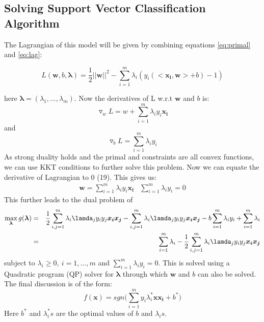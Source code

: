 \documentclass{article}
\begin{document}
\subsection{Solving Support Vector Classification Algorithm}
The Lagrangian of this model will be given by combining equations \ref{eq:primal} and \ref{eq:lag}:
\begin{center}
\begin{equation*}
    L(\bm{w},b,\bm{\lambda}) = \frac{1}{2} ||\bm{w}||^2 - \sum_{i=1}^{m}{\lambda_i(y_i(<\bm{x_i},\bm{w}> +b) -1)}
\end{equation*}
\end{center}
here $\bm{\lambda} = (\lambda_1,...,\lambda_m)$. Now the derivatives of L w.r.t $\bm{w}$ and $b$ is:
\begin{equation*}
    \triangledown_w L = w + \sum_{i=1}^{m}{\lambda_iy_i\bm{x_i}}
\end{equation*} and 
\begin{equation*}
    \triangledown_b L = \sum_{i=1}^{m}{\lambda_iy_i}
\end{equation*}
As strong duality holds and the primal and constraints are all convex functions, we can use KKT conditions to further solve this problem. Now we can equate the derivative of Lagrangian to 0 (19). This gives us:
\begin{eqnarray}
\bm{w} = \sum_{i=1}^{m}{\lambda_iy_i\bm{x_i}} & \sum_{i=1}^{m}{\lambda_iy_i} =0
\end{eqnarray}
This further leads to the dual problem of
\begin{eqnarray}
    \max_{\bm{\lambda}} g(\bm{\lambda}) & = & \frac{1}{2} \sum_{i,j=1}^{m}{\lambda_i\lamda_jy_iy_j\bm{x_i}\bm{x_j}} -  \sum_{i,j=1}^{m}{\lambda_i\lamda_jy_iy_j\bm{x_i}\bm{x_j}} - b\sum_{i=1}^m{\lambda_iy_i} + \sum_{i=1}^m{\lambda_i} \nonumber \\
    & = & \sum_{i=1}^m{\lambda_i} - \frac{1}{2} \sum_{i,j=1}^{m}{\lambda_i\lamda_jy_iy_j\bm{x_i}\bm{x_j}}
\end{eqnarray}
subject to $\lambda_i \geq 0, \ i = 1,...,m$ and $\sum_{i=1}^{m}{\lambda_iy_i} =0$. This is solved using a Quadratic program (QP) solver for $\bm{\lambda}$ through which $\bm{w}$ and $b$ can also be solved. The final discussion is of the form:
\begin{equation}
    f(\bm{x}) = sgn \Big( \sum_{i=1}^{m}{y_i\lambda_i^*\bm{xx_i}} + b^* \big)
\end{equation}
Here $b^*$ and $\lambda_i^*s$ are the optimal values of $b$ and $\lambda_is$.
\end{document}
